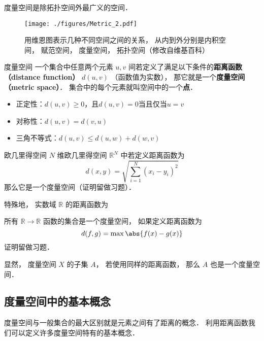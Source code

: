 

度量空间是除拓扑空间外最广义的空间．
\begin{figure}[ht]
\centering
\texttt{[image: ./figures/Metric\_2.pdf]}
\caption{用维恩图表示几种不同空间之间的关系， 从内到外分别是内积空间， 赋范空间， 度量空间， 拓扑空间（修改自维基百科）} \label{Metric_fig2}
\end{figure}

\begin{definition}{度量空间}
一个集合中任意两个元素 $u, v$ 间若定义了满足以下条件的\textbf{距离函数（distance function）} $d(u, v)$ （函数值为实数）， 那它就是一个\textbf{度量空间（metric space）}． 集合中的每个元素就叫空间中的一个\textbf{点}．
\begin{itemize}
\item 正定性：$d(u, v) \geq 0$，且$d(u, v)=0$当且仅当$u=v$
\item 对称性：$d(u, v) = d(v, u)$
\item 三角不等式：$d(u, v) \leqslant d(u, w) + d(w, v)$
\end{itemize}
\end{definition}

\begin{example}{欧几里得空间}
$N$ 维欧几里得空间 $\mathbb R^N$ 中若定义距离函数为
\begin{equation}
d(x, y) = \sqrt{\sum_{i=1}^N (x_i - y_i)^2}
\end{equation}
那么它是一个度量空间（证明留做习题）．

特殊地， 实数域 $\mathbb R$ 的距离函数为
\end{example}

\begin{example}{}
所有 $\mathbb R \to \mathbb R$ 函数的集合是一个度量空间， 如果定义距离函数为
\begin{equation}
d(f, g) = \max{\abs{f(x) - g(x)}}
\end{equation}
证明留做习题．
\end{example}

显然， 度量空间 $X$ 的子集 $A$， 若使用同样的距离函数， 那么 $A$ 也是一个度量空间．

\subsection{度量空间中的基本概念}
度量空间与一般集合的最大区别就是元素之间有了距离的概念． 利用距离函数我们可以定义许多度量空间特有的基本概念．

